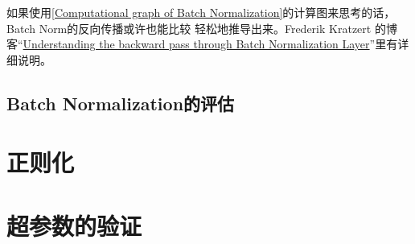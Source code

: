 如果使用\autoref{Computational graph of Batch Normalization}的计算图来思考的话，Batch Norm的反向传播或许也能比较
轻松地推导出来。Frederik Kratzert 的博客“\href{https://kratzert.github.io/2016/02/12/understanding-the-gradient-flow-through-the-batch-normalization-layer.html}{Understanding the backward pass through Batch Normalization Layer}”里有详细说明。

\subsection{Batch Normalization的评估}
\section{正则化}
\section{超参数的验证}